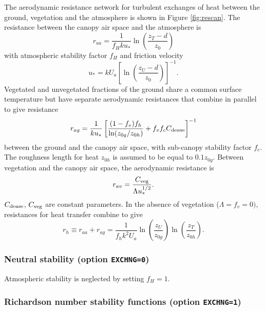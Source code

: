 \documentclass{article}
\begin{document}
The aerodynamic resistance network for turbulent exchanges of heat between the ground, vegetation and the atmosphere is shown in Figure \ref{fig:rescan}. The resistance between the canopy air space and the atmosphere is
\begin{equation}
r_{aa} = \frac{1}{f_H k u_*}\ln\left(\frac{z_T-d}{z_0}\right)
\label{eq:raa} 
\end{equation}
with atmospheric stability factor $f_H$ and friction velocity
\begin{equation}
u_* = kU_a\left[\ln\left(\frac{z_U-d}{z_0}\right)\right]^{-1}.
\end{equation}
Vegetated and unvegetated fractions of the ground share a common surface temperature but have separate aerodynamic resistances that combine in parallel to give resistance
\begin{equation}
r_{ag} = \frac{1}{ku_*}\left[\frac{(1-f_v)f_h}{\ln(z_{0g}/z_{0h})} + 
                             f_vf_cC_{\rm dense}\right]^{-1}
\label{eq:rag} 
\end{equation}
between the ground and the canopy air space, with sub-canopy stability factor $f_c$. The roughness length for heat $z_{0h}$ is assumed to be equal to $0.1z_{0g}$. Between vegetation and the canopy air space, the aerodynamic resistance is
\begin{equation}
r_{av} = \frac{C_{\rm veg}}{\Lambda u_*^{1/2}}.
\end{equation}
$C_{\rm dense}$, $C_{\rm veg}$ are constant parameters. In the absence of vegetation ($\Lambda=f_v=0)$, resistances for heat transfer combine to give
\begin{equation}
r_h \equiv r_{aa} + r_{ag} = \frac{1}{f_hk^2U_a}\ln\left(\frac{z_U}{z_{0g}}\right)
                                                \ln\left(\frac{z_T}{z_{0h}}\right).
\label{eq:rh}
\end{equation}

\subsubsection{Neutral stability (option {\tt EXCHNG=0})}

Atmospheric stability is neglected by setting $f_H=1$.

\subsubsection{Richardson number stability functions (option {\tt EXCHNG=1})}
\end{document}
